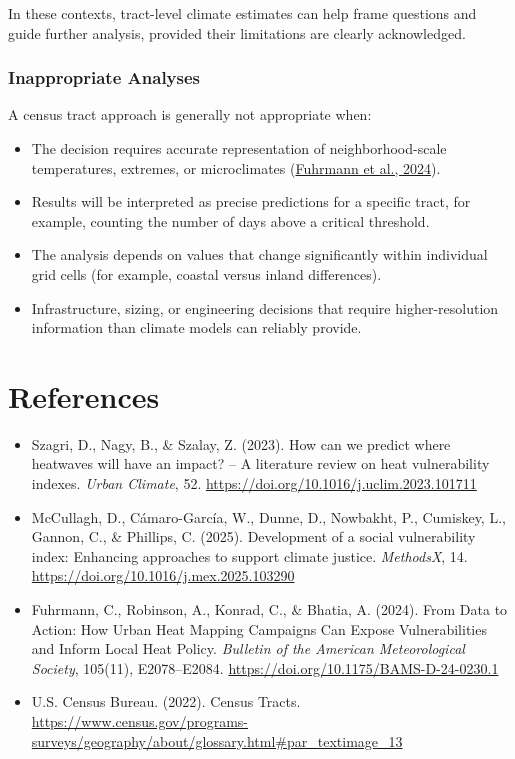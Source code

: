 \documentclass[
  letterpaper,
  DIV=11,
  numbers=noendperiod]{scrartcl}
\providecommand{\tightlist}{%
  \setlength{\itemsep}{0pt}\setlength{\parskip}{0pt}}
\begin{document}
In these contexts, tract-level climate estimates can help frame
questions and guide further analysis, provided their limitations are
clearly acknowledged.

\subsubsection{Inappropriate Analyses}\label{inappropriate-analyses}

A census tract approach is generally not appropriate when:

\begin{itemize}
\tightlist
\item
  The decision requires accurate representation of neighborhood-scale
  temperatures, extremes, or microclimates
  (\href{https://doi.org/10.1175/BAMS-D-24-0230.1}{Fuhrmann et al.,
  2024}).
\item
  Results will be interpreted as precise predictions for a specific
  tract, for example, counting the number of days above a critical
  threshold.
\item
  The analysis depends on values that change significantly within
  individual grid cells (for example, coastal versus inland
  differences).
\item
  Infrastructure, sizing, or engineering decisions that require
  higher-resolution information than climate models can reliably
  provide.
\end{itemize}

\section{References}\label{references}

\begin{itemize}
\tightlist
\item
  Szagri, D., Nagy, B., \& Szalay, Z. (2023). How can we predict where
  heatwaves will have an impact? -- A literature review on heat
  vulnerability indexes. \emph{Urban Climate}, 52.
  \url{https://doi.org/10.1016/j.uclim.2023.101711}
\item
  McCullagh, D., Cámaro-García, W., Dunne, D., Nowbakht, P., Cumiskey,
  L., Gannon, C., \& Phillips, C. (2025). Development of a social
  vulnerability index: Enhancing approaches to support climate justice.
  \emph{MethodsX}, 14. \url{https://doi.org/10.1016/j.mex.2025.103290}
\item
  Fuhrmann, C., Robinson, A., Konrad, C., \& Bhatia, A. (2024). From
  Data to Action: How Urban Heat Mapping Campaigns Can Expose
  Vulnerabilities and Inform Local Heat Policy. \emph{Bulletin of the
  American Meteorological Society}, 105(11), E2078--E2084.
  \url{https://doi.org/10.1175/BAMS-D-24-0230.1}
\item
  U.S. Census Bureau. (2022). Census Tracts.
  \url{https://www.census.gov/programs-surveys/geography/about/glossary.html\#par_textimage_13}
\end{itemize}
\end{document}
